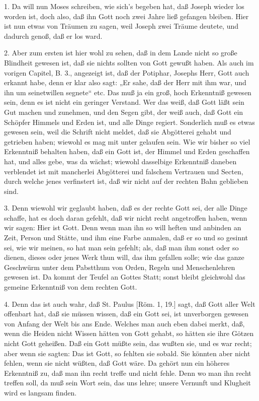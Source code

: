 1. Da will nun Moses schreiben, wie sich’s begeben hat, daß Joseph wieder los worden ist, doch also, daß ihn Gott noch zwei Jahre ließ gefangen bleiben. Hier ist nun etwas von Träumen zu sagen, weil Joseph zwei Träume deutete, und dadurch genoß, daß er los ward.

2. Aber zum ersten ist hier wohl zu sehen, daß in dem Lande nicht so große Blindheit gewesen ist, daß sie nichts sollten von Gott gewußt haben. Als auch im vorigen Capitel, B. 3., angezeigt ist, daß der Potiphar, Josephs Herr, Gott auch erkannt habe, denn er klar also sagt: „Er sahe, daß der Herr mit ihm war, und ihn um seinetwillen segnete“ etc. Das muß ja ein groß, hoch Erkenntniß gewesen sein, denn es ist nicht ein geringer Verstand. Wer das weiß, daß Gott läßt sein Gut machen und zunehmen, und den Segen gibt, der weiß auch, daß Gott ein Schöpfer Himmels und Erden ist, und alle Dinge regiert. Sonderlich muß es etwas gewesen sein, weil die Schrift nicht meldet, daß sie Abgötterei gehabt und getrieben haben; wiewohl es mag mit unter gelaufen sein. Wie wir bisher so viel Erkenntniß behalten haben, daß ein Gott ist, der Himmel und Erden geschaffen hat, und alles gebe, was da wächst; wiewohl dasselbige Erkenntniß daneben verblendet ist mit mancherlei Abgötterei und falschem Vertrauen und Secten, durch welche jenes verfinstert ist, daß wir nicht auf der rechten Bahn geblieben sind.

3. Denn wiewohl wir geglaubt haben, daß es der rechte Gott sei, der alle Dinge schaffe, hat es doch daran gefehlt, daß wir nicht recht angetroffen haben, wenn wir sagen: Hier ist Gott. Denn wenn man ihn so will heften und anbinden an Zeit, Person und Stätte, und ihm eine Farbe anmalen, daß er so und so gesinnt sei, wie wir meinen, so hat man sein gefehlt; als, daß man ihm sonst oder so dienen, dieses oder jenes Werk thun will, das ihm gefallen solle; wie das ganze Geschwürm unter dem Pabstthum von Orden, Regeln und Menschenlehren gewesen ist. Da kommt der Teufel an Gottes Statt; sonst bleibt gleichwohl das gemeine Erkenntniß von dem rechten Gott.

4. Denn das ist auch wahr, daß St. Paulus [Röm. 1, 19.] sagt, daß Gott aller Welt offenbart hat, daß sie müssen wissen, daß ein Gott sei, ist unverborgen gewesen von Anfang der Welt bis ans Ende. Welches man auch eben dabei merkt, daß, wenn die Heiden nicht Wissen hätten von Gott gehabt, so hätten sie ihre Götzen nicht Gott geheißen. Daß ein Gott müßte sein, das wußten sie, und es war recht; aber wenn sie sagten: Das ist Gott, so fehlten sie sobald. Sie könnten aber nicht fehlen, wenn sie nicht wüßten, daß Gott wäre. Da gehört nun ein höheres Erkenntniß zu, daß man ihn recht treffe und nicht fehle. Denn wo man ihn recht treffen soll, da muß sein Wort sein, das uns lehre; unsere Vernunft und Klugheit wird es langsam finden.

